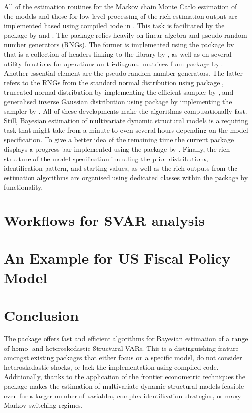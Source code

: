 \documentclass[
  nojss]{jss}
\begin{document}
All of the estimation routines for the Markov chain Monte Carlo
estimation of the models and those for low level processing of the rich
estimation output are implemented based using compiled code in
. This task is facilitated by the  package by
\cite{eddelbuettel2011rcpp} and \cite{eddelbuettel_seamless_2013}. The
 package relies heavily on linear algebra and pseudo-random
number generators (RNGs). The former is implemented using the package
 by \cite{eddelbuettel_rcpparmadillo2014} that is a
collection of headers linking to the  library
 by \cite{sanderson2016armadillo}, as well as on several
utility functions for operations on tri-diagonal matrices from package
 by \cite{factorstochvol}. Another essential element are
the pseudo-random number generators. The latter refers to the RNGs from
the standard normal distribution using package ,
truncated normal distribution  by \cite{RcppTN} implementing
the efficient sampler by \cite{Robert1995}, and generalised inverse
Gaussian distribution using package  by \cite{GIGrvg}
implementing the sampler by \cite{hormann2014generating}. All of these
developments make the algorithms computationally fast. Still, Bayesian
estimation of multivariate dynamic structural models is a requiring task
that might take from a minute to even several hours depending on the
model specification. To give a better idea of the remaining time the
current package displays a progress bar implemented using the package
 by \cite{RcppProgress}. Finally, the rich structure
of the model specification including the prior distributions,
identification pattern, and starting values, as well as the rich outputs
from the estimation algorithms are organised using dedicated classes
within the  package by \cite{R6} functionality.

\section{Workflows for SVAR analysis}

\section{An Example for US Fiscal Policy Model}

\section{Conclusion}

The  package offers fast and efficient algorithms for
Bayesian estimation of a range of homo- and heteroskedastic Structural
VARs. This is a distinguishing feature amongst existing 
packages that either focus on a specific model, do not consider
heteroskedastic shocks, or lack the implementation using compiled code.
Additionally, thanks to the application of the frontier econometric
techniques the package makes the estimation of multivariate dynamic
structural models feasible even for a larger number of variables,
complex identification strategies, or many Markov-switching regimes.


\end{document}
